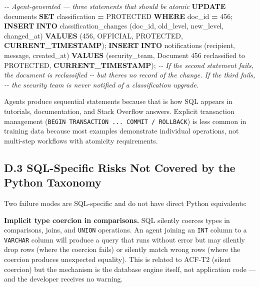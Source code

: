 \documentclass[a4paper,11pt]{report}
\newenvironment{Shaded}{\begin{snugshade}}{\end{snugshade}}
\newcommand{\CommentTok}[1]{\textcolor[rgb]{0.56,0.35,0.01}{\textit{#1}}}
\newcommand{\DecValTok}[1]{\textcolor[rgb]{0.00,0.00,0.81}{#1}}
\newcommand{\FunctionTok}[1]{\textcolor[rgb]{0.13,0.29,0.53}{\textbf{#1}}}
\newcommand{\KeywordTok}[1]{\textcolor[rgb]{0.13,0.29,0.53}{\textbf{#1}}}
\newcommand{\NormalTok}[1]{#1}
\newcommand{\OperatorTok}[1]{\textcolor[rgb]{0.81,0.36,0.00}{\textbf{#1}}}
\newcommand{\StringTok}[1]{\textcolor[rgb]{0.31,0.60,0.02}{#1}}
\begin{document}
\begin{Shaded}
\begin{Highlighting}[]
\CommentTok{{-}{-} Agent{-}generated — three statements that should be atomic}
\KeywordTok{UPDATE}\NormalTok{ documents }\KeywordTok{SET}\NormalTok{ classification }\OperatorTok{=} \StringTok{\textquotesingle{}PROTECTED\textquotesingle{}} \KeywordTok{WHERE}\NormalTok{ doc\_id }\OperatorTok{=} \DecValTok{456}\NormalTok{;}
\KeywordTok{INSERT} \KeywordTok{INTO}\NormalTok{ classification\_changes (doc\_id, old\_level, new\_level, changed\_at)}
    \KeywordTok{VALUES}\NormalTok{ (}\DecValTok{456}\NormalTok{, }\StringTok{\textquotesingle{}OFFICIAL\textquotesingle{}}\NormalTok{, }\StringTok{\textquotesingle{}PROTECTED\textquotesingle{}}\NormalTok{, }\FunctionTok{CURRENT\_TIMESTAMP}\NormalTok{);}
\KeywordTok{INSERT} \KeywordTok{INTO}\NormalTok{ notifications (recipient, message, created\_at)}
    \KeywordTok{VALUES}\NormalTok{ (}\StringTok{\textquotesingle{}security\_team\textquotesingle{}}\NormalTok{, }\StringTok{\textquotesingle{}Document 456 reclassified to PROTECTED\textquotesingle{}}\NormalTok{, }\FunctionTok{CURRENT\_TIMESTAMP}\NormalTok{);}
\CommentTok{{-}{-} If the second statement fails, the document is reclassified}
\CommentTok{{-}{-} but there\textquotesingle{}s no record of the change. If the third fails,}
\CommentTok{{-}{-} the security team is never notified of a classification upgrade.}
\end{Highlighting}
\end{Shaded}

Agents produce sequential statements because that is how SQL appears in
tutorials, documentation, and Stack Overflow answers. Explicit
transaction management
(\texttt{BEGIN\ TRANSACTION\ ...\ COMMIT\ /\ ROLLBACK}) is less common
in training data because most examples demonstrate individual
operations, not multi-step workflows with atomicity requirements.

\hypertarget{d.3-sql-specific-risks-not-covered-by-the-python-taxonomy}{%
\subsection{D.3 SQL-Specific Risks Not Covered by the Python
Taxonomy}\label{d.3-sql-specific-risks-not-covered-by-the-python-taxonomy}}

Two failure modes are SQL-specific and do not have direct Python
equivalents:

\textbf{Implicit type coercion in comparisons.} SQL silently coerces
types in comparisons, joins, and \texttt{UNION} operations. An agent
joining an \texttt{INT} column to a \texttt{VARCHAR} column will produce
a query that runs without error but may silently drop rows (where the
coercion fails) or silently match wrong rows (where the coercion
produces unexpected equality). This is related to ACF-T2 (silent
coercion) but the mechanism is the database engine itself, not
application code --- and the developer receives no warning.
\end{document}
